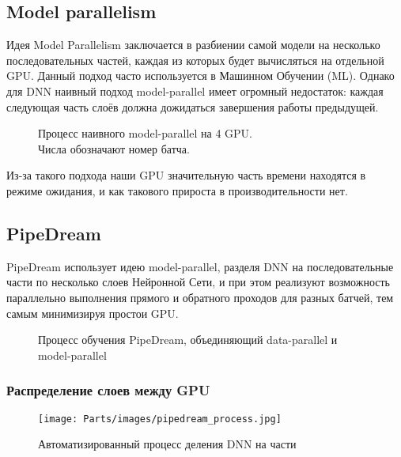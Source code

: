 \subsection{Model parallelism}
Идея Model Parallelism заключается в разбиении самой модели на несколько последовательных частей, каждая из которых будет вычисляться на отдельной GPU. Данный подход часто используется в Машинном Обучении (ML). Однако для DNN наивный подход model-parallel имеет огромный недостаток: каждая следующая часть слоёв должна дожидаться завершения работы предыдущей.

\begin{figure}[h]%
	\centering
	\caption{Процесс наивного model-parallel на 4 GPU. \\Числа обозначают номер батча.}
	\label{framework} %
\end{figure}

Из-за такого подхода наши GPU значительную часть времени находятся в режиме ожидания, и как такового прироста в производительности нет.

\subsection{PipeDream}
PipeDream использует идею model-parallel, разделя DNN на последовательные части по несколько слоев Нейронной Сети, и при этом реализуют возможность параллельно выполнения прямого и обратного проходов для разных батчей, тем самым минимизируя простои GPU.

\begin{figure}[h]%
	\centering
	\caption{Процесс обучения PipeDream, объединяющий data-parallel и model-parallel}
	\label{framework} %
\end{figure}

\newpage
\subsubsection{Распределение слоев между GPU}

\begin{wrapfigure}[14]{r}{0.5\textwidth}
    \vspace{-2cm}
	\begin{center}
		\texttt{[image: Parts/images/pipedream\_process.jpg]}
	\end{center}
	\caption{Автоматизированный процесс деления DNN на части}
    \label{fig:transformer1}
\end{wrapfigure}

